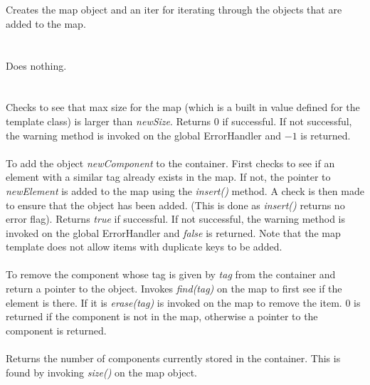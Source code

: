  \\
 \\
Creates the map object and an iter for iterating through the objects
that are added to the map. \\

 \\
 \\ 
Does nothing.\\

 \\
\\
Checks to see that max size for the map (which is a built in value
defined for the template class) is larger than {\em newSize}. Returns
$0$ if successful. If not successful, the warning method is invoked
on the global ErrorHandler and $-1$ is returned.\\

\\
To add the object {\em newComponent} to the container. First checks to
see if an element with a similar tag already exists in the map. If
not, the pointer to {\em newElement} is added to the map using the
{\em insert()} method. A check is then made to ensure that the object
has been added. (This is done as {\em insert()} returns no error flag).
Returns {\em true} if successful. If not successful, the warning
method is invoked on the global ErrorHandler and {\em false} is
returned. Note that the map template does not allow items with
duplicate keys to be added.\\ 
 
\\
To remove the component whose tag is given by {\em tag} from the
container and return a pointer to the object. Invokes {\em find(tag)}
on the map to first see if the element is there. If it is {\em
erase(tag)} is invoked on the map to remove the item. $0$ is returned
if the component is not in the map, otherwise a pointer to the component
is returned.\\

\\
Returns the number of components currently stored in the
container. This is found by invoking {\em size()} on the map object.\\

